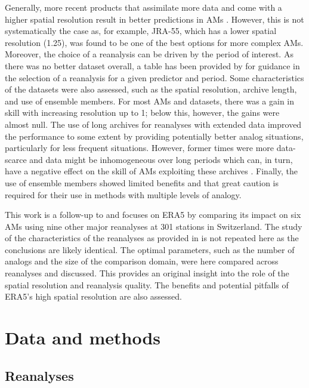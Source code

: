 \documentclass[alpha-refs]{wiley-article}
\begin{document}
Generally, more recent products that assimilate more data and come with a higher spatial resolution result in better predictions in AMs \citep{Horton2018b}. However, this is not systematically the case as, for example, JRA-55, which has a lower spatial resolution (1.25\degree), was found to be one of the best options for more complex AMs. Moreover, the choice of a reanalysis can be driven by the period of interest. As there was no better dataset overall, a table has been provided by \citet{Horton2018b} for guidance in the selection of a reanalysis for a given predictor and period. Some characteristics of the datasets were also assessed, such as the spatial resolution, archive length, and use of ensemble members. For most AMs and datasets, there was a gain in skill with increasing resolution up to 1\degree; below this, however, the gains were almost null. The use of long archives for reanalyses with extended data improved the performance to some extent by providing potentially better analog situations, particularly for less frequent situations. However, former times were more data-scarce and data might be inhomogeneous over long periods which can, in turn, have a negative effect on the skill of AMs exploiting these archives \citep{Horton2018b}. Finally, the use of ensemble members showed limited benefits and that great caution is required for their use in methods with multiple levels of analogy.

This work is a follow-up to \citet{Horton2018b} and focuses on ERA5 by comparing its impact on six AMs using nine other major reanalyses at 301 stations in Switzerland. The study of the characteristics of the reanalyses as provided in \citet{Horton2018b} is not repeated here as the conclusions are likely identical. The optimal parameters, such as the number of analogs and the size of the comparison domain, were here compared across reanalyses and discussed. This provides an original insight into the role of the spatial resolution and reanalysis quality. The benefits and potential pitfalls of ERA5’s high spatial resolution are also assessed.


\section{Data and methods}
\label{sec:data_methods}

\subsection{Reanalyses}
\label{sec:reanalyses}
\end{document}
